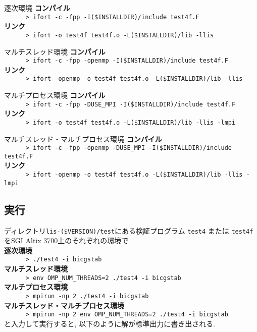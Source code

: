 \documentclass[a4paper]{jarticle}
\begin{document}
{{\begin{itembox}[l]{逐次環境}
\small
{\bf コンパイル}\\
\verb+      > ifort -c -fpp -I($INSTALLDIR)/include test4f.F+\\
{\bf リンク}\\
\verb+      > ifort -o test4f test4f.o -L($INSTALLDIR)/lib -llis+\\
\end{itembox}
\begin{itembox}[l]{マルチスレッド環境}
\small
{\bf コンパイル}\\
\verb+      > ifort -c -fpp -openmp -I($INSTALLDIR)/include test4f.F+\\
{\bf リンク}\\
\verb+      > ifort -openmp -o test4f test4f.o -L($INSTALLDIR)/lib -llis+\\
\end{itembox}
\begin{itembox}[l]{マルチプロセス環境}
\small
{\bf コンパイル}\\
\verb+      > ifort -c -fpp -DUSE_MPI -I($INSTALLDIR)/include test4f.F+\\
{\bf リンク}\\
\verb+      > ifort -o test4f test4f.o -L($INSTALLDIR)/lib -llis -lmpi+\\
\end{itembox}
\begin{itembox}[l]{マルチスレッド・マルチプロセス環境}
\small
{\bf コンパイル}\\
\verb+      > ifort -c -fpp -openmp -DUSE_MPI -I($INSTALLDIR)/include test4f.F+\\
{\bf リンク}\\
\verb+      > ifort -openmp -o test4f test4f.o -L($INSTALLDIR)/lib -llis -lmpi+\\
\end{itembox}

\subsection{実行}
ディレクトリ\verb|lis-($VERSION)/test|にある検証プログラム
\verb|test4| または \verb|test4f| をSGI Altix 3700上のそれぞれの環境で \\
{\bf 逐次環境}\\
\verb+      > ./test4 -i bicgstab+\\
{\bf マルチスレッド環境}\\
\verb+      > env OMP_NUM_THREADS=2 ./test4 -i bicgstab +\\
{\bf マルチプロセス環境}\\
\verb+      > mpirun -np 2 ./test4 -i bicgstab +\\
{\bf マルチスレッド・マルチプロセス環境}\\
\verb+      > mpirun -np 2 env OMP_NUM_THREADS=2 ./test4 -i bicgstab +\\
と入力して実行すると, 以下のように解が標準出力に書き出される. 

}}
\end{document}
